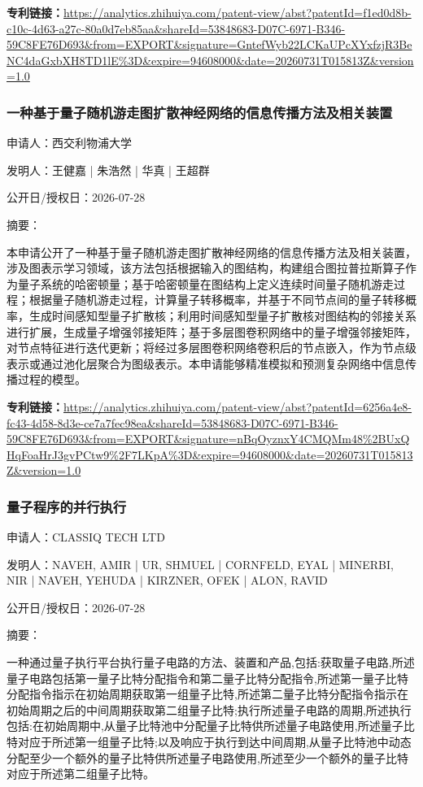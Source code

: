 \documentclass[12pt,a4paper]{ctexart}
\begin{document}
\noindent\textbf{专利链接：}\url{https://analytics.zhihuiya.com/patent-view/abst?patentId=f1ed0d8b-c10c-4d63-a27c-80a0d7eb85aa&shareId=53848683-D07C-6971-B346-59C8FE76D693&from=EXPORT&signature=GntefWyb22LCKaUPcXYxfzjR3BeNC4daGxbXH8TD1lE%3D&expire=94608000&date=20260731T015813Z&version=1.0}

\subsubsection{ 一种基于量子随机游走图扩散神经网络的信息传播方法及相关装置 }

申请人：西交利物浦大学

发明人：王健嘉 | 朱浩然 | 华真 | 王超群

公开日/授权日：2026-07-28

摘要：

本申请公开了一种基于量子随机游走图扩散神经网络的信息传播方法及相关装置，涉及图表示学习领域，该方法包括根据输入的图结构，构建组合图拉普拉斯算子作为量子系统的哈密顿量；基于哈密顿量在图结构上定义连续时间量子随机游走过程；根据量子随机游走过程，计算量子转移概率，并基于不同节点间的量子转移概率，生成时间感知型量子扩散核；利用时间感知型量子扩散核对图结构的邻接关系进行扩展，生成量子增强邻接矩阵；基于多层图卷积网络中的量子增强邻接矩阵，对节点特征进行迭代更新；将经过多层图卷积网络卷积后的节点嵌入，作为节点级表示或通过池化层聚合为图级表示。本申请能够精准模拟和预测复杂网络中信息传播过程的模型。

\noindent\textbf{专利链接：}\url{https://analytics.zhihuiya.com/patent-view/abst?patentId=6256a4e8-fc43-4d58-8d3e-ce7a7fec98ea&shareId=53848683-D07C-6971-B346-59C8FE76D693&from=EXPORT&signature=nBqOyznxY4CMQMm48%2BUxQHqFoaHrJ3gvPCtw9%2F7LKpA%3D&expire=94608000&date=20260731T015813Z&version=1.0}

\subsubsection{ 量子程序的并行执行 }

申请人：CLASSIQ TECH LTD

发明人：NAVEH, AMIR | UR, SHMUEL | CORNFELD, EYAL | MINERBI, NIR | NAVEH, YEHUDA | KIRZNER, OFEK | ALON, RAVID

公开日/授权日：2026-07-28

摘要：

一种通过量子执行平台执行量子电路的方法、装置和产品,包括:获取量子电路,所述量子电路包括第一量子比特分配指令和第二量子比特分配指令,所述第一量子比特分配指令指示在初始周期获取第一组量子比特,所述第二量子比特分配指令指示在初始周期之后的中间周期获取第二组量子比特;执行所述量子电路的周期,所述执行包括:在初始周期中,从量子比特池中分配量子比特供所述量子电路使用,所述量子比特对应于所述第一组量子比特;以及响应于执行到达中间周期,从量子比特池中动态分配至少一个额外的量子比特供所述量子电路使用,所述至少一个额外的量子比特对应于所述第二组量子比特。
\end{document}
